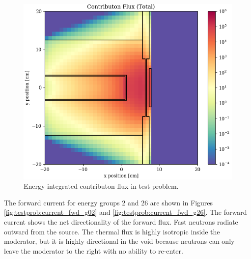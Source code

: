 \begin{figure}
  \centering
  \includegraphics[width=0.5\linewidth]{content/testprob/scalar_flux_con_total.png}
  \caption{Energy-integrated contributon flux in test problem.}
  \label{fig:testprob:scalar_flux_con_total}
\end{figure}

The forward current for energy groups 2 and 26 are shown in Figures \ref{fig:testprob:current_fwd_g02} and \ref{fig:testprob:current_fwd_g26}.
The forward current shows the net directionality of the forward flux.
Fast neutrons radiate outward from the source.
The thermal flux is highly isotropic inside the moderator, but it is highly directional in the void because neutrons can only leave the moderator to the right with no ability to re-enter.

